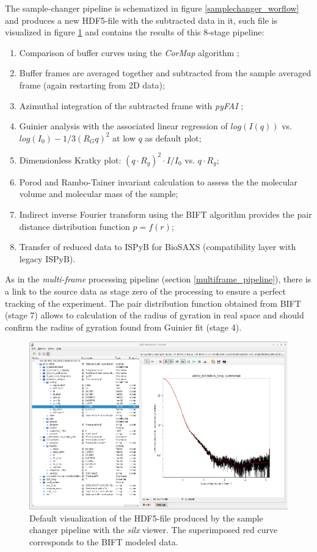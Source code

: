 \documentclass[preprint]{iucr}              %
\begin{document}
The sample-changer pipeline is schematized in figure \ref{samplechanger_worflow} and produces a new HDF5-file with the subtracted data in it, such file is visualized in figure \ref{subtracted} and contains the results of this 8-stage pipeline: 
\begin{enumerate}
    \item Comparison of buffer curves using the \textit{CorMap} algorithm \cite{CorMap};
    \item Buffer frames are averaged together and subtracted from the sample averaged frame (again restarting from 2D data);
    \item Azimuthal integration of the subtracted frame with \textit{pyFAI} \cite{pyfai_2020};
    \item Guinier analysis with the associated linear regression of $log(I(q))$ vs. $log(I_0)-1/3 (R_{G}q)^{2}$ at low $q$ as default plot;
    \item Dimensionless Kratky plot: $(q\cdot R_g)^2\cdot I/I_0$  vs. $q\cdot R_g$;
    \item Porod \cite{glatter+kratky} and Rambo-Tainer invariant \cite{RamboTainerNature2013} calculation to assess the the molecular volume and molecular mass of the sample;
    \item Indirect inverse Fourier transform using the BIFT algorithm \cite{bift} provides the pair distance distribution function $p=f(r)$;
    \item Transfer of reduced data to ISPyB for BioSAXS (compatibility layer with legacy ISPyB).
\end{enumerate}
As in the \textit{multi-frame} processing pipeline (section \ref{multiframe_pipeline}), there is a link to the source data as stage zero of the processing to ensure a perfect tracking of the experiment.
The pair distribution function obtained from BIFT (stage 7) allows to calculation of the radius of gyration in real space and should confirm the radius of gyration found from Guinier fit (stage 4). 

\begin{figure}
    \label{subtracted}
    \includegraphics[width=12cm]{subtracted.eps}
    \caption{Default visualization of the HDF5-file produced by the sample changer pipeline with the \textit{silx} viewer. 
    The superimposed red curve corresponds to the BIFT modeled data.}
\end{figure}
\end{document}
